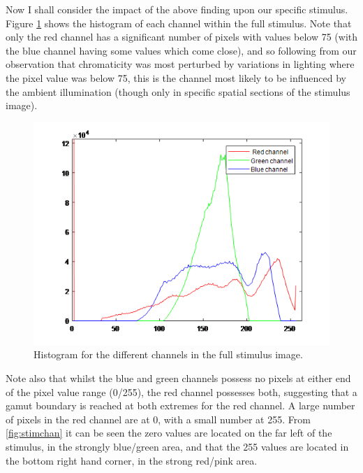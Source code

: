 
Now I shall consider the impact of the above finding upon our specific stimulus. Figure \ref{fig:stimhist} shows the histogram of each channel within the full stimulus. Note that only the red channel has a significant number of pixels with values below 75 (with the blue channel having some values which come close), and so following from our observation that chromaticity was most perturbed by variations in lighting where the pixel value was below 75, this is the channel most likely to be influenced by the ambient illumination (though only in specific spatial sections of the stimulus image).

\begin{figure}[hbtp]
\includegraphics[max width=\textwidth]{figs/tablet/stimhist.png}
\caption{Histogram for the different channels in the full stimulus image.} %
\label{fig:stimhist}
\end{figure}

Note also that whilst the blue and green channels possess no pixels at either end of the pixel value range (0/255), the red channel possesses both, suggesting that a gamut boundary is reached at both extremes for the red channel. A large number of pixels in the red channel are at 0, with a small number at 255. From \ref{fig:stimchan} it can be seen the zero values are located on the far left of the stimulus, in the strongly blue/green area, and that the 255 values are located in the bottom right hand corner, in the strong red/pink area.

